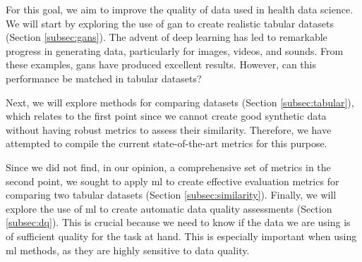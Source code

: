 For this goal, we aim to improve the quality of data used in health data science. We will start by exploring the use of \ac{gan} to create realistic tabular datasets (Section \ref{subsec:gans}). The advent of deep learning has led to remarkable progress in generating data, particularly for images, videos, and sounds. From these examples, \acp{gan} have produced excellent results. However, can this performance be matched in tabular datasets?

Next, we will explore methods for comparing datasets (Section \ref{subsec:tabular}), which relates to the first point since we cannot create good synthetic data without having robust metrics to assess their similarity. Therefore, we have attempted to compile the current state-of-the-art metrics for this purpose.

Since we did not find, in our opinion, a comprehensive set of metrics in the second point, we sought to apply \ac{ml} to create effective evaluation metrics for comparing two tabular datasets (Section \ref{subsec:similarity}). Finally, we will explore the use of \ac{ml} to create automatic data quality assessments (Section \ref{subsec:dq}). This is crucial because we need to know if the data we are using is of sufficient quality for the task at hand. This is especially important when using \ac{ml} methods, as they are highly sensitive to data quality.



